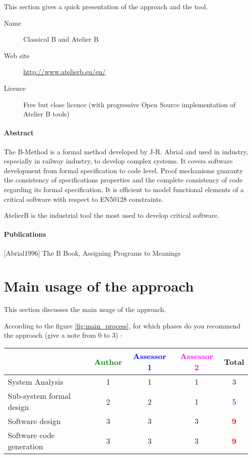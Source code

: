 This section gives a quick presentation of the approach and the tool.

\begin{description}
\item[Name] Classical B and Atelier B
\item[Web site] \url{http://www.atelierb.eu/en/}
\item[Licence] Free but close licence (with progressive Open Source implementation of Atelier B tools)
\end{description}

\paragraph{Abstract} 

The B-Method is a formal method developed by J-R. Abrial and used in industry, especially in railway industry, to develop complex systems. It covers software development from formal specification to code level. Proof mechanisms guaranty the consistency of specifications properties and the complete consistency of code regarding its formal specification. It is efficient to model  functional  elements of a critical software with respect to  EN50128 constraints.

AtelierB is the industrial  tool the most used to develop critical software.

\paragraph{Publications} 
[Abrial1996] The B Book, Assigning Programs to Meanings


\section{Main usage of the approach}
\label{main_usage}
This section discusses the main usage of the approach.

According to the figure \ref{fig:main_process}, for which phases do you recommend the approach (give a note from 0 to  3) :

\begin{tabular}{|l | c | c | c | c|}
\hline
& \textcolor{green}{Author} & \textcolor{blue}{Assessor 1} & \textcolor{magenta}{Assessor 2} & Total \\
\hline 
System Analysis & 1    & 1    & 1    & 3    \\
\hline
Sub-system formal design & 2    & 2    & 1    & \textcolor{blue}{5} \\
\hline
Software design & 3    & 3    & 3    & \textcolor{red}{\textbf{9}} \\
\hline
Software code generation & 3    & 3    & 3    & \textcolor{red}{\textbf{9}} \\
\hline
\end{tabular}

